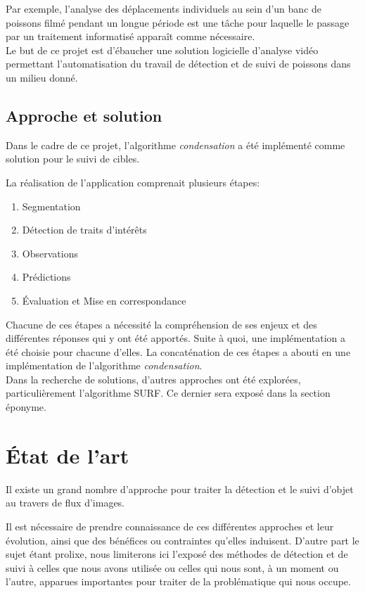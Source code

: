 \documentclass[a4paper,11pt]{report}
\begin{document}
Par exemple, l'analyse des déplacements individuels au sein d'un banc de poissons filmé pendant un longue période est une tâche pour laquelle le passage par un traitement informatisé apparaît comme nécessaire.\\

Le but de ce projet est d'ébaucher une solution logicielle d'analyse vidéo permettant l'automatisation du travail de détection et de suivi de poissons dans un milieu donné. 

\section{Approche et solution}
Dans le cadre de ce projet, l'algorithme \textit{condensation} a été implémenté comme solution pour le suivi de cibles.

La réalisation de l'application comprenait plusieurs étapes:
\begin{enumerate}
\item Segmentation
\item Détection de traits d'intérêts 
\item Observations
\item Prédictions
\item Évaluation et Mise en correspondance
\end{enumerate}
Chacune de ces étapes a nécessité la compréhension de ses enjeux et des différentes réponses qui y ont été apportés. Suite à quoi, une implémentation a été choisie pour chacune d'elles.
La concaténation de ces étapes a abouti en une implémentation de l'algorithme \textit{condensation}.\\

Dans la recherche de solutions, d'autres approches ont été explorées, particulièrement l'algorithme SURF. Ce dernier sera exposé dans la section éponyme.  


\chapter{\'{E}tat de l'art}

Il existe un grand nombre d'approche pour traiter la détection et le suivi d'objet au travers de flux d'images. 

Il est nécessaire de prendre connaissance de ces différentes approches et leur évolution, ainsi que des bénéfices ou contraintes qu'elles induisent. D'autre part le sujet étant prolixe, nous limiterons ici l'exposé des méthodes de détection et de suivi à celles que nous avons utilisée ou celles qui nous sont, à un moment ou l'autre, apparues importantes pour traiter de la problématique qui nous occupe.
\end{document}
